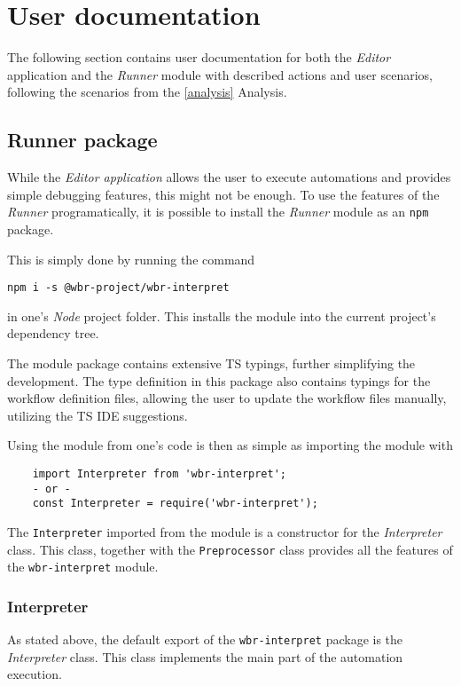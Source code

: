 \section{User documentation}

The following section contains user documentation for both the \textit{Editor} application and the \textit{Runner} module with described actions and user scenarios, following the scenarios from the \autoref{analysis} Analysis.



\subsection{Runner package}
While the \textit{Editor application} allows the user to execute automations and provides simple debugging features, this might not be enough.
To use the features of the \textit{Runner} programatically, it is possible to install the \textit{Runner} module as an \texttt{npm} package.

This is simply done by running the command
\begin{center}
\verb|npm i -s @wbr-project/wbr-interpret|
\end{center}
in one's \textit{Node} project folder. 
This installs the module into the current project's dependency tree.

The module package contains extensive \acs{TS} typings, further simplifying the development.
The type definition in this package also contains typings for the workflow definition files, allowing the user to update the workflow files manually, utilizing the \acl{TS} \acs{IDE} suggestions.

Using the module from one's code is then as simple as importing the module with
\begin{verbatim}
    import Interpreter from 'wbr-interpret';
    - or -
    const Interpreter = require('wbr-interpret');
\end{verbatim}

The \verb|Interpreter| imported from the module is a constructor for the \textit{Interpreter} class.
This class, together with the \verb|Preprocessor| class provides all the features of the \texttt{wbr-interpret} module.

\subsubsection{Interpreter}

As stated above, the default export of the \texttt{wbr-interpret} package is the \textit{Interpreter} class.
This class implements the main part of the automation execution.

